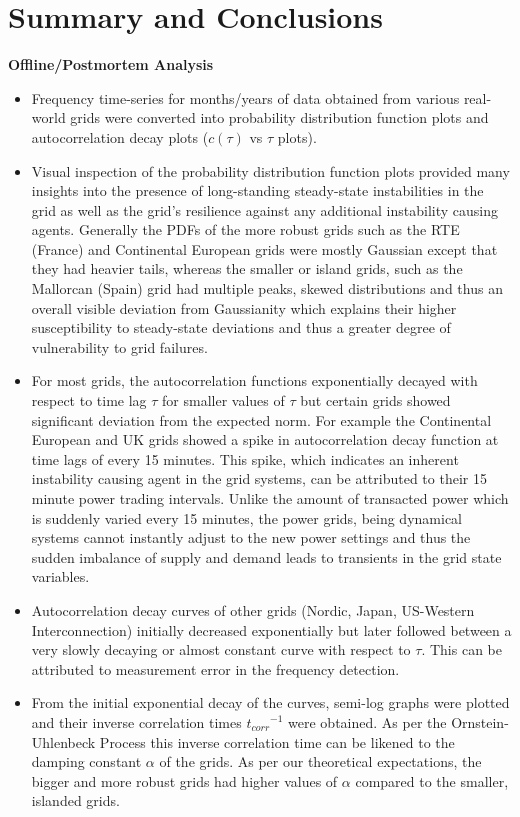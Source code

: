 \section[Conclusions]{Summary and Conclusions}
\label{sec:concl}

\noindent\textbf{Offline/Postmortem Analysis}
\begin{itemize}
	\item Frequency time-series for months/years of data obtained from various real-world grids were converted into probability distribution function plots and autocorrelation decay plots ($c(\tau)$ vs $\tau$ plots).
	\item Visual inspection of the probability distribution function plots provided many insights into the presence of long-standing steady-state instabilities in the grid as well as the grid's resilience against any additional instability causing agents. Generally the PDFs of the more robust grids such as the RTE (France) and Continental European grids were mostly Gaussian except that they had heavier tails, whereas the smaller or island grids, such as the Mallorcan (Spain) grid had multiple peaks, skewed distributions and thus an overall visible deviation from Gaussianity which explains their higher susceptibility to steady-state deviations and thus a greater degree of vulnerability to grid failures. 
	\item For most grids, the autocorrelation functions exponentially decayed with respect to time lag $\tau$ for smaller values of $\tau$ but certain grids showed significant deviation from the expected norm. For example the Continental European and UK grids showed a spike in autocorrelation decay function at time lags of every 15 minutes. This spike, which indicates an inherent instability causing agent in the grid systems, can be attributed to their 15 minute power trading intervals. Unlike the amount of transacted power which is suddenly varied every 15 minutes, the power grids, being dynamical systems cannot instantly adjust to the new power settings and thus the sudden imbalance of supply and demand leads to transients in the grid state variables.
	\item Autocorrelation decay curves of other grids (Nordic, Japan, US-Western Interconnection) initially decreased exponentially but later followed between a very slowly decaying or almost constant curve with respect to $\tau$. This can be attributed to measurement error in the frequency detection.
	\item From the initial exponential decay of the curves, semi-log graphs were plotted and their inverse correlation times ${t_{corr}}^{-1}$ were obtained. As per the Ornstein-Uhlenbeck Process this inverse correlation time can be likened to the damping constant $\alpha$ of the grids. As per our theoretical expectations, the bigger and more robust grids had higher values of $\alpha$ compared to the smaller, islanded grids.
\end{itemize}

